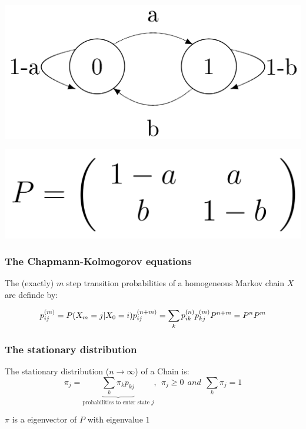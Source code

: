 \begin{minipage}{0.4\textwidth}
\includegraphics[width=0.8\linewidth]{./Content/Markov/statediag}
\end{minipage}
\begin{minipage}{0.4\textwidth}
\includegraphics[width=0.8\linewidth]{./Content/Markov/statetab}
\end{minipage}
\hfill


\subsubsection{The Chapmann-Kolmogorov equations }
The (exactly) $m$ step transition probabilities of a homogeneous Markov chain $X$ are definde by: 

\begin{equation}
	p_{ij}^{(m)}=P(X_m=j|X_0=i)	\\ 
	p_{ij}^{(n+m)}=\sum\limits_k{p_{ik}^{(n)}p_{kj}^{(m)}}\\
	P^{n+m}=P^nP^m\nonumber
\end{equation}


\subsubsection{The stationary distribution }
The stationary distribution ($n\rightarrow \infty$) of a Chain is:
\begin{equation}
	\boxed{\pi_{j}=\underbrace{\sum\limits_k{\pi_k p_{kj}}}_{\text{probabilities to enter state }j},~~ \pi_j\geq 0 ~~ and ~~ \sum\limits_k{\pi_j}=1}\nonumber
\end{equation}

$\pi$ is a eigenvector of $P$ with eigenvalue $1$\\

